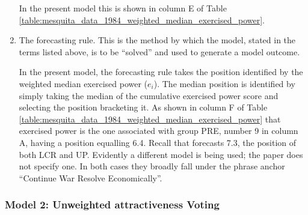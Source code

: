 \begin{enumerate}
In the present model this is shown in column E of Table \ref{table:mesquita_data_1984_weighted_median_exercised_power}.

\item The forecasting rule. This is the method by which the  model, stated in the terms listed above, is to be ``solved'' and used to generate a model outcome. %

In the present model, the forecasting rule takes the   {position} identified by the weighted median   {exercised power} ($e_i$).  The median   {position} is identified by simply taking the median of the cumulative   {exercised power} score and selecting the   {position} bracketing it. As shown in column F of Table \ref{table:mesquita_data_1984_weighted_median_exercised_power} that   {exercised power} is the one associated with group PRE, number 9 in column A, having a   {position} equalling 6.4. Recall that 
\cite{mesquita_1984} forecasts 7.3, the   {position} of both LCR and UP.  Evidently a different model is being used; the paper does not specify one. In both cases they broadly fall under the phrase anchor ``Continue War Resolve Economically''.
  \renewcommand{\theenumi}{\arabic{enumi}}
\end{enumerate}



\subsubsection{Model 2: Unweighted   {attractiveness} Voting\label{sec:unweighted_attractiveness_voting}}



